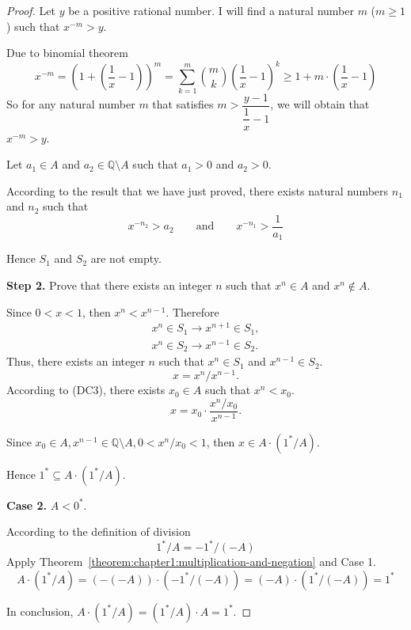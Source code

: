 \begin{proof}
    Let $y$ be a positive rational number. I will find a natural number $m$ ($m\ge 1$) such that $x^{-m} > y$.

    Due to binomial theorem
    \[
        x^{-m} = {\left(1 + \left(\frac{1}{x} - 1\right)\right)}^{m} = \sum^{m}_{k=1}\binom{m}{k}{\left(\frac{1}{x} - 1\right)}^{k} \ge 1 + m\cdot\left(\frac{1}{x} - 1\right)
    \]
    So for any natural number $m$ that satisfies $m > \dfrac{y - 1}{\dfrac{1}{x} - 1}$, we will obtain that $x^{-m} > y$.

    Let $a_{1}\in A$ and $a_{2}\in\mathbb{Q}\setminus A$ such that $a_{1} > 0$ and $a_{2} > 0$.

    According to the result that we have just proved, there exists natural numbers $n_{1}$ and $n_{2}$ such that
    \[
        x^{-{n}_{2}} > a_{2}\qquad\text{and}\qquad x^{-{n}_{1}} > \frac{1}{a_{1}}
    \]

    Hence $S_{1}$ and $S_{2}$ are not empty.

    \textbf{Step 2.} Prove that there exists an integer $n$ such that $x^{n}\in A$ and $x^{n}\notin A$.

    Since $0 < x < 1$, then $x^{n} < x^{n-1}$. Therefore
    \[
        \begin{split}
            x^{n}\in S_{1}\rightarrow x^{n+1}\in S_{1}, \\
            x^{n}\in S_{2}\rightarrow x^{n-1}\in S_{2}.
        \end{split}
    \]
    Thus, there exists an integer $n$ such that $x^{n}\in S_{1}$ and $x^{n-1}\in S_{2}$.
    \bigskip
    \[
        x = {x^{n}} / {x^{n-1}}.
    \]
    According to (DC3), there exists $x_{0}\in A$ such that $x^{n} < x_{0}$.
    \[
        x = x_{0}\cdot\frac{x^{n}/x_{0}}{x^{n-1}}.
    \]

    Since $x_{0}\in A, x^{n-1}\in\mathbb{Q}\setminus A, 0 < x^{n}/x_{0} < 1$, then $x\in A\cdot ({1}^{*}/A)$.

    Hence ${1}^{*}\subseteq A\cdot ({1}^{*}/A)$.

    \bigskip
    \textbf{Case 2.} $A < {0}^{*}$.

    According to the definition of division
    \[
        {1}^{*}/A = -{1}^{*}/(-A)
    \]
    Apply Theorem~\ref{theorem:chapter1:multiplication-and-negation} and Case 1.
    \[
        A\cdot ({1}^{*}/A) = (-(-A))\cdot (-{1}^{*}/(-A)) = (-A)\cdot ({1}^{*}/(-A)) = {1}^{*}
    \]

    In conclusion, $A\cdot ({1}^{*}/A) = ({1}^{*}/A)\cdot A = {1}^{*}$.
\end{proof}

